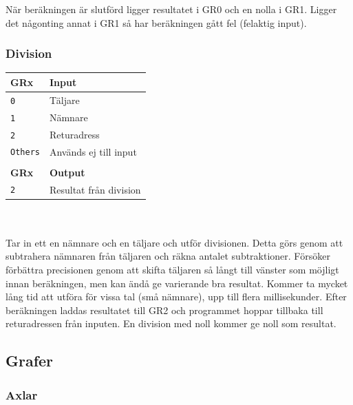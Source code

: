 \documentclass[]{article}
\begin{document}
När beräkningen är slutförd ligger resultatet i GR0 och en nolla i GR1. Ligger det någonting annat i GR1 så har beräkningen gått fel (felaktig input).

\subsubsection{Division}
\begin{tabular}{ll}
	\textbf{GRx}    & \textbf{Input}         \\ \hline
	\texttt{0}      & Täljare                \\
	\texttt{1}      & Nämnare                \\
	\texttt{2}      & Returadress            \\
	\texttt{Others} & Används ej till input  \\
	                &  \\
	\textbf{GRx}    & \textbf{Output}        \\ \hline
	\texttt{2}      & Resultat från division
\end{tabular}
\\\\
\noindent
Tar in ett en nämnare och en täljare och utför divisionen. Detta görs genom att subtrahera nämnaren från täljaren och räkna antalet subtraktioner. Försöker förbättra precisionen genom att skifta täljaren så långt till vänster som möjligt innan beräkningen, men kan ändå ge varierande bra resultat. Kommer ta mycket lång tid att utföra för vissa tal (små nämnare), upp till flera millisekunder. Efter beräkningen laddas resultatet till GR2 och programmet hoppar tillbaka till returadressen från inputen. En division med noll kommer ge noll som resultat.

\subsection{Grafer}
\subsubsection{Axlar}
\end{document}
